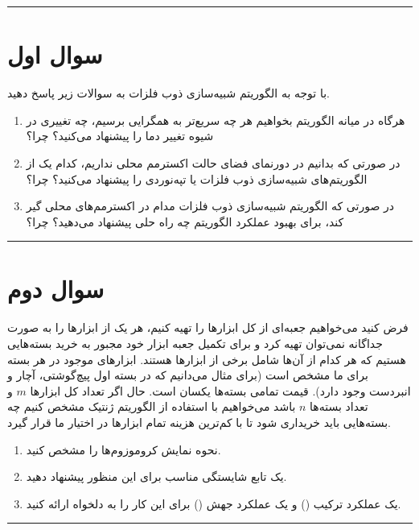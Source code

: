 \documentclass[a4paper,10pt]{article}
\begin{document}
\vspace{8pt}
\textcolor{AccentCyan}{\rule{\linewidth}{0.8pt}}
\section{\textcolor{AccentGold}{سوال اول}}
با توجه به الگوریتم شبیه‌سازی ذوب فلزات به سوالات زیر پاسخ دهید.

\begin{enumerate}
	\item[(الف)] هرگاه در میانه الگوریتم بخواهیم هر چه سریع‌تر به همگرایی برسیم، چه تغییری در شیوه تغییر دما را پیشنهاد می‌کنید؟ چرا؟
	
	\item[(ب)] در صورتی که بدانیم در دورنمای فضای حالت اکسترمم محلی نداریم، کدام یک از الگوریتم‌های شبیه‌سازی ذوب فلزات یا تپه‌نوردی را پیشنهاد می‌کنید؟ چرا؟
	
	\item[(ج)] در صورتی که الگوریتم شبیه‌سازی ذوب فلزات مدام در اکسترمم‌های محلی گیر کند، برای بهبود عملکرد الگوریتم چه راه حلی پیشنهاد می‌دهید؟ چرا؟
\end{enumerate}
\bigskip
\textcolor{AccentCyan}{\rule{\linewidth}{0.4pt}}
\section{\textcolor{AccentGold}{سوال دوم}}

فرض کنید می‌خواهیم جعبه‌ای از کل ابزارها را تهیه کنیم، هر یک از ابزارها را به صورت جداگانه نمی‌توان تهیه کرد و برای تکمیل جعبه ابزار خود مجبور به خرید بسته‌هایی هستیم که هر کدام از آن‌ها شامل برخی از ابزارها هستند.
ابزارهای موجود در هر بسته برای ما مشخص است (برای مثال می‌دانیم که در بسته اول پیچ‌گوشتی، آچار و انبردست وجود دارد). قیمت تمامی بسته‌ها یکسان است. حال اگر تعداد کل ابزارها $m$ و تعداد بسته‌ها $n$ باشد می‌خواهیم با استفاده از الگوریتم ژنتیک مشخص کنیم چه بسته‌هایی باید خریداری شود تا با کم‌ترین هزینه تمام ابزارها در اختیار ما قرار گیرد.

\begin{enumerate}
	\item[(الف)] نحوه نمایش کروموزوم‌ها را مشخص کنید.
	
	\item[(ب)] یک تابع شایستگی مناسب برای این منظور پیشنهاد دهید.
	
	\item[(ج)] یک عملکرد ترکیب () و یک عملکرد جهش () برای این کار را به دلخواه ارائه کنید.
\end{enumerate}
\bigskip
\textcolor{AccentCyan}{\rule{\linewidth}{0.4pt}}
\end{document}
